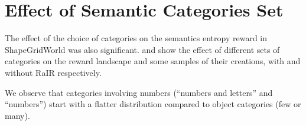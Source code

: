 \section{Effect of Semantic Categories Set}
\label{sec:sgw-categories}
The effect of the choice of categories on the semantics entropy reward in ShapeGridWorld was also significant.
 and  show the effect of different sets of categories on the reward landscape and some samples of their creations, with and without RaIR respectively.

We observe that categories involving numbers (``numbers and letters'' and ``numbers'') start with a flatter distribution compared to object categories (few or many).

